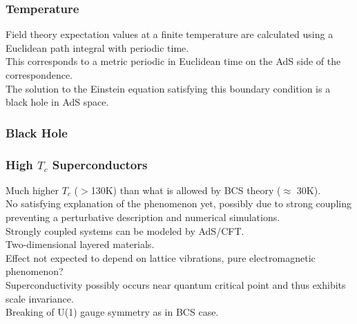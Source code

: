 \documentclass{beamer}
\begin{document}


\begin{frame}
\frametitle{Temperature}
Field theory expectation values at a finite temperature are calculated using a Euclidean path integral with periodic time.\\
This corresponds to a metric periodic in Euclidean time on the AdS side of the correspondence.\\
The solution to the Einstein equation satisfying this boundary condition is a black hole in AdS space.
\end{frame}

\begin{frame}
\frametitle{Black Hole}
\begin{figure}
 \centering
{}
\end{figure}
\end{frame}


\begin{frame}
\frametitle{High $T_c$ Superconductors}
Much higher $T_c$ ($>$130K) than what is allowed by BCS theory ($\approx$ 30K).\\
No satisfying explanation of the phenomenon yet, possibly due to strong coupling preventing a perturbative description and numerical simulations.\\
Strongly coupled systems can be modeled by AdS/CFT.\\
\vspace{0.3cm}
Two-dimensional layered materials.\\
Effect not expected to depend on lattice vibrations, pure electromagnetic phenomenon?\\
Superconductivity possibly occurs near quantum critical point and thus exhibits scale invariance.\\
Breaking of U(1) gauge symmetry as in BCS case.
\end{frame}
\end{document}
